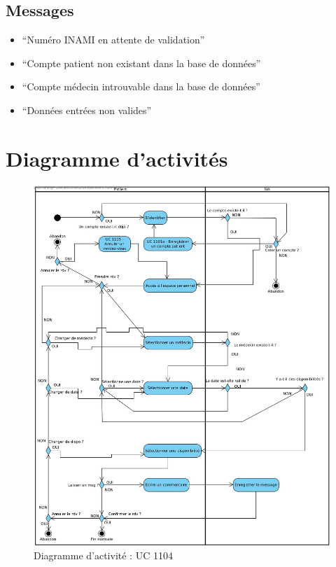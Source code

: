 \subsection{Messages}
\begin{itemize}
	\item ``Numéro INAMI en attente de validation''
	\item ``Compte patient non existant dans la base de données''
	\item ``Compte médecin introuvable dans la base de données''
	\item ``Données entrées non valides''
\end{itemize}
\newpage

\section{Diagramme d'activités}
\begin{figure}[hb]
	\centering
	\includegraphics[scale=0.4]{MCT/activiteUC1104.jpg}
	\caption{Diagramme d'activité : UC 1104}
	\label{fig:act1104}
\end{figure}
\newpage

